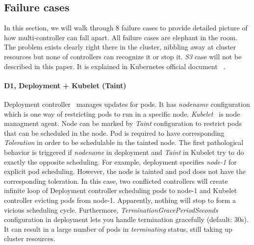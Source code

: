 \subsection*{Failure cases}
In this section, we will walk through 8 failure cases to provide detailed picture of how multi-controller can fall apart. All failure cases are elephant in the room. The problem exists clearly right there in the cluster, nibbling away at cluster resources but none of controllers can recognize it or stop it.  \textit{S3} case will not be described in this paper. It is explained in Kubernetes official document ~\cite{s3_failure}.

\paragraph*{D1, Deployment + Kubelet (Taint)}
Deployment controller~\cite{deployment} manages updates for pods. It has \textit{nodename} configuration which is one way of restricting pods to run in a specific node.
\textit{Kubelet}~\cite{kubelet} is node managment agent. Node can be marked by \textit{Taint} configuration to restrict pods that can be scheduled in the node. Pod is required to have corresponding \textit{Toleration} in order to be schedulable in the tainted node. 
The first pathological behavior is triggered if \textit{nodename} in deployment and \textit{Taint} in Kubelet try to do exactly the opposite scheduling. 
For example, deployment specifies \textit{node-1} for explicit pod scheduling.
However, the node is tainted and pod does not have the corresponding toleration.
In this case, two conflicted controllers will create infinite loop of Deployment controller scheduling pods to node-1 and Kubelet controller evicting pods from node-1. Apparently, nothing will stop to form a vicious scheduling cycle. 
Furthermore, \textit{TerminationGracePeriodSeconds} configuration in deployment lets you handle termination gracefully (default: 30s). It can result in a large number of pods in \textit{terminating} status, still taking up cluster resources. 


